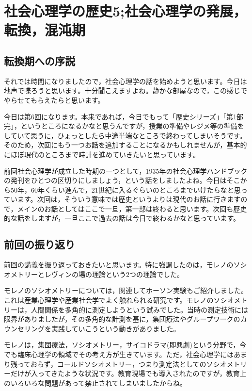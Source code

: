 \documentclass{ltjsbook}
\begin{document}
\setcounter{chapter}{5}
\chapter{社会心理学の歴史5;社会心理学の発展，転換，混沌期}
\label{sp06_history3}
\section{転換期への序説}
それでは時間になりましたので，社会心理学の話を始めようと思います。今日は地声で喋ろうと思います。十分聞こえますよね。静かな部屋なので，この感じでやらせてもらえたらと思います。

今日は第6回になります。本来であれば，今日でもって「歴史シリーズ」「第1部完」，というところになるかなと思うんですが，授業の準備やレジメ等の準備をしていて思うに，ひょっとしたら中途半端なところで終わってしまいそうです。そのため，次回にもう一つお話を追加することになるかもしれませんが，基本的にほぼ現代のところまで時計を進めていきたいと思っています。

前回社会心理学が成立した時期の一つとして，1935年の社会心理学ハンドブックの発刊をひとつの区切りにしましょう，という話をしましたよね。今日はそこから50年，60年くらい進んで，21世紀に入るぐらいのところまでいけたらなと思っています。次回は，そういう意味では歴史というよりは現代のお話に行きますので，メインのお話としてはここで一旦，第一部は終わると思います。次回も歴史的な話をしますが，一旦ここで過去の話は今日で終わるかなと思っています。

\section{前回の振り返り}

前回の講義を振り返っておきたいと思います。特に強調したのは，モレノのソシオメトリーとレヴィンの場の理論という2つの理論でした。

モレノのソシオメトリーについては，関連してホーソン実験もご紹介しました。これは産業心理学や産業社会学でよく触れられる研究です。モレノのソシオメトリーは，人間関係を多角的に測定しようという試みでした。当時の測定技術には限界がありましたが，その多角的な計測を基に，集団療法やグループワークのカウンセリングを実践していこうという動きがありました。

モレノは，集団療法，ソシオメトリー，サイコドラマ(即興劇)という分野で，今でも臨床心理学の領域でその考え方が生きています。ただ，社会心理学にはあまり残っておらず，コールドソシオメトリー，つまり測定法としてのソシオメトリーだけが入ってきたような状況です。教育現場でも導入されたのですが，教育上のいろいろな問題があって禁止されてしまいましたからね。
\end{document}
